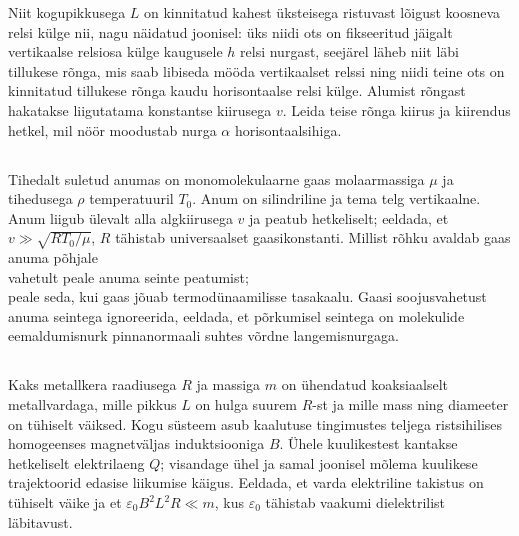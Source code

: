 \documentclass[10pt]{article}
\begin{document}
Niit kogupikkusega $L$ on kinnitatud kahest üksteisega ristuvast lõigust koosneva relsi külge nii, nagu näidatud joonisel: üks niidi ots on fikseeritud jäigalt vertikaalse relsiosa külge kaugusele $h$ relsi nurgast, seejärel läheb niit läbi tillukese rõnga, mis saab libiseda mööda vertikaalset relssi ning niidi teine ots on kinnitatud tillukese rõnga kaudu horisontaalse relsi külge. Alumist rõngast hakatakse liigutatama konstantse kiirusega $v$. Leida teise rõnga kiirus ja kiirendus hetkel, mil nöör moodustab nurga $\alpha$ horisontaalsihiga.
\probend
\bigskip
\newpage\subsection{\protect{}}


Tihedalt suletud anumas on monomolekulaarne gaas molaarmassiga $\mu$ ja tihedusega $\rho$ temperatuuril $T_0$. Anum on silindriline ja tema telg vertikaalne. Anum liigub ülevalt alla algkiirusega $v$ ja peatub hetkeliselt; eeldada, et $v\gg \sqrt{RT_0/\mu}$, $R$ tähistab universaalset gaasikonstanti. Millist rõhku avaldab gaas anuma põhjale\\
\osa vahetult peale anuma seinte peatumist;\\
\osa peale seda, kui gaas jõuab termodünaamilisse tasakaalu. Gaasi soojusvahetust anuma seintega ignoreerida, eeldada, et põrkumisel seintega on molekulide eemaldumisnurk pinnanormaali suhtes võrdne langemisnurgaga.
\probend
\bigskip
\newpage\subsection{\protect{}}


Kaks metallkera raadiusega $R$ ja massiga $m$ on ühendatud koaksiaalselt metallvardaga, mille pikkus $L$ on hulga suurem $R$-st ja mille mass ning diameeter on tühiselt väiksed. Kogu süsteem asub kaalutuse tingimustes teljega ristsihilises homogeenses magnetväljas induktsiooniga $B$. Ühele kuulikestest kantakse hetkeliselt elektrilaeng $Q$; visandage ühel ja samal joonisel mõlema kuulikese trajektoorid edasise liikumise käigus. Eeldada, et varda elektriline takistus on tühiselt väike ja et $\varepsilon_0B^2L^2R\ll m$, kus $\varepsilon_0$ tähistab vaakumi dielektrilist läbitavust.
\probend
\bigskip
\end{document}
